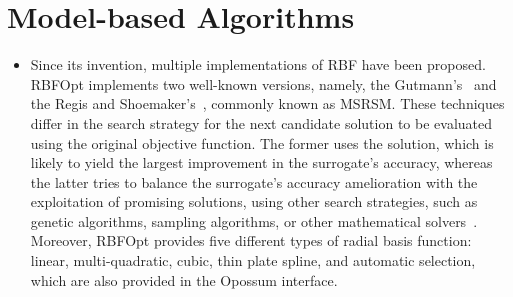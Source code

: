\section{Model-based Algorithms}
\begin{itemize}
	\item 	Since its invention, multiple implementations of \ac{RBF} have been proposed. RBFOpt implements two well-known versions, namely, the Gutmann's~\cite{Gutmann2001} and the Regis and Shoemaker's~\cite{Regis2007}, commonly known as MSRSM. These techniques differ in the search strategy for the next candidate solution to be evaluated using the original objective function. The former uses the solution, which is likely to yield the largest improvement in the surrogate's accuracy, whereas the latter tries to balance the surrogate's accuracy amelioration with the exploitation of promising solutions, using other search strategies, such as genetic algorithms, sampling algorithms, or other mathematical solvers~\cite{Wortmann2017Opossum}. Moreover, RBFOpt provides five different types of radial basis function: linear, multi-quadratic, cubic, thin plate spline, and automatic selection, which are also provided in the Opossum interface.
\end{itemize}